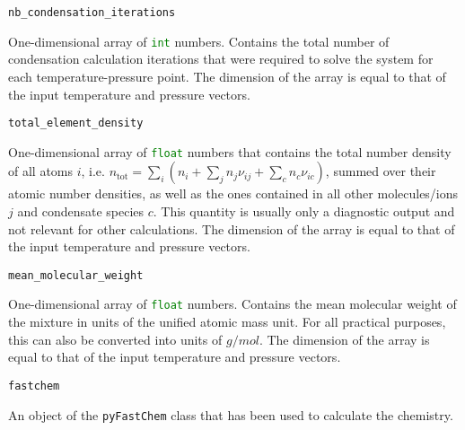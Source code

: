 \documentclass[numbers=noenddot]{aux/fcmanual}
\newcommand{\pfc}{\texttt{pyFastChem}\xspace}
\begin{document}
\bigbreak

\lstinline!nb_condensation_iterations!
\begin{addmargin}[25pt]{0pt}
	One-dimensional array of \lstinline[language=Python]!int! numbers. Contains the total number of condensation calculation iterations that were required to solve the system for each temperature-pressure point. The dimension of the array is equal to that of the input temperature and pressure vectors.
\end{addmargin}

\bigbreak

\lstinline!total_element_density!
\begin{addmargin}[25pt]{0pt}
	One-dimensional array of \lstinline[language=Python]!float! numbers that contains the total number density of all atoms $i$, i.e. $n_\mathrm{tot} = \sum_i \left( n_i + \sum_j n_j \nu_{ij} + \sum_c n_c \nu_{ic}\right)$, summed over their atomic number densities, as well as the ones contained in all other molecules/ions $j$ and condensate species $c$. This quantity is usually only a diagnostic output and not relevant for other calculations. The dimension of the array is equal to that of the input temperature and pressure vectors.
\end{addmargin}

\bigbreak

\lstinline!mean_molecular_weight!
\begin{addmargin}[25pt]{0pt}
	One-dimensional array of \lstinline[language=Python]!float! numbers. Contains the mean molecular weight of the mixture in units of the unified atomic mass unit. For all practical purposes, this can also be converted into units of $\unit{g/mol}$. The dimension of the array is equal to that of the input temperature and pressure vectors.
\end{addmargin}

\bigbreak

\lstinline[language=Python]!fastchem!
\begin{addmargin}[25pt]{0pt}
	An object of the \pfc class that has been used to calculate the chemistry. 
\end{addmargin}

\bigbreak
\end{document}
